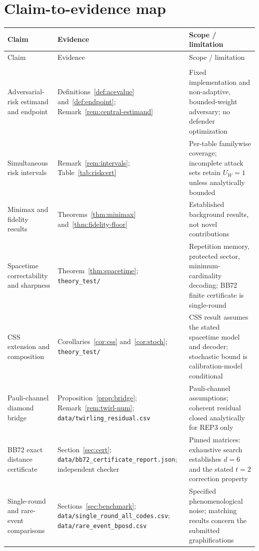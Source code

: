 \documentclass[pdflatex,sn-mathphys-num]{sn-jnl}
\theoremstyle{thmstyleone}
\theoremstyle{thmstyletwo}
\theoremstyle{thmstylethree}
\begin{document}
\section{Claim-to-evidence map}
\begingroup\small
\setlength{\tabcolsep}{3pt}
\renewcommand{\arraystretch}{1.12}
\begin{longtable}{@{}>{\raggedright\arraybackslash}p{3.4cm}>{\raggedright\arraybackslash}p{4.0cm}>{\raggedright\arraybackslash}p{4.3cm}@{}}
\toprule Claim & Evidence & Scope / limitation \\\midrule
\endfirsthead
\toprule Claim & Evidence & Scope / limitation \\\midrule
\endhead
\multicolumn{3}{r}{\small\itshape continued on next page}\\
\endfoot
\bottomrule
\endlastfoot
Adversarial-risk estimand and endpoint & Definitions~\ref{def:acevalue} and~\ref{def:endpoint}; Remark~\ref{rem:central-estimand} & Fixed implementation and non-adaptive, bounded-weight adversary; no defender optimization \\
Simultaneous risk intervals & Remark~\ref{rem:intervals}; Table~\ref{tab:riskcert} & Per-table familywise coverage; incomplete attack sets retain $U_W=1$ unless analytically bounded \\
Minimax and fidelity results & Theorems~\ref{thm:minimax} and~\ref{thm:fidelity-floor} & Established background results, not novel contributions \\
Spacetime correctability and sharpness & Theorem~\ref{thm:spacetime}; \texttt{theory\_\allowbreak test/} & Repetition memory, protected sector, minimum-cardinality decoding; BB72 finite certificate is single-round \\
CSS extension and composition & Corollaries~\ref{cor:css} and~\ref{cor:stoch}; \texttt{theory\_\allowbreak test/} & CSS result assumes the stated spacetime model and decoder; stochastic bound is calibration-model conditional \\
Pauli-channel diamond bridge & Proposition~\ref{prop:bridge}; Remark~\ref{rem:twirl-num}; \texttt{data/\allowbreak twirling\_\allowbreak residual.csv} & Pauli-channel assumptions; coherent residual closed analytically for REP3 only \\
BB72 exact distance certificate & Section~\ref{sec:cert}; \texttt{data/\allowbreak bb72\_\allowbreak certificate\_\allowbreak report.json}; independent checker & Pinned matrices: exhaustive search establishes $d=6$ and the stated $t=2$ correction property \\
Single-round and rare-event comparisons & Sections~\ref{sec:benchmark}; \texttt{data/\allowbreak single\_\allowbreak round\_\allowbreak all\_\allowbreak codes.csv}; \texttt{data/\allowbreak rare\_\allowbreak event\_\allowbreak bposd.csv} & Specified phenomenological noise; matching results concern the submitted graphifications \\

\end{longtable}
\end{document}
